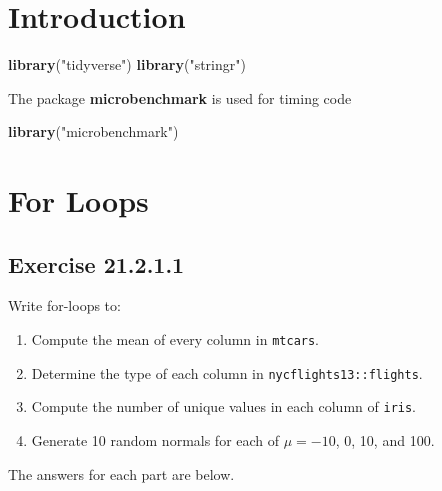 \documentclass[]{book}
\newenvironment{Shaded}{\begin{snugshade}}{\end{snugshade}}
\newcommand{\KeywordTok}[1]{\textcolor[rgb]{0.13,0.29,0.53}{\textbf{#1}}}
\newcommand{\NormalTok}[1]{#1}
\newcommand{\StringTok}[1]{\textcolor[rgb]{0.31,0.60,0.02}{#1}}
\providecommand{\tightlist}{%
  \setlength{\itemsep}{0pt}\setlength{\parskip}{0pt}}
\theoremstyle{plain}
\theoremstyle{remark}
\begin{document}
\hypertarget{introduction-14}{%
\section{Introduction}\label{introduction-14}}

\begin{Shaded}
\begin{Highlighting}[]
\KeywordTok{library}\NormalTok{(}\StringTok{"tidyverse"}\NormalTok{)}
\KeywordTok{library}\NormalTok{(}\StringTok{"stringr"}\NormalTok{)}
\end{Highlighting}
\end{Shaded}

The package \textbf{microbenchmark} is used for timing code

\begin{Shaded}
\begin{Highlighting}[]
\KeywordTok{library}\NormalTok{(}\StringTok{"microbenchmark"}\NormalTok{)}
\end{Highlighting}
\end{Shaded}

\hypertarget{for-loops}{%
\section{For Loops}\label{for-loops}}

\hypertarget{exercise-21.2.1.1}{%
\subsection*{\texorpdfstring{Exercise {21.2.1.1}}{Exercise 21.2.1.1}}\label{exercise-21.2.1.1}}

Write for-loops to:

\begin{enumerate}
\def\labelenumi{\arabic{enumi}.}
\tightlist
\item
  Compute the mean of every column in \texttt{mtcars}.
\item
  Determine the type of each column in \texttt{nycflights13::flights}.
\item
  Compute the number of unique values in each column of \texttt{iris}.
\item
  Generate 10 random normals for each of \(\mu = -10\), 0, 10, and 100.
\end{enumerate}

The answers for each part are below.
\end{document}
